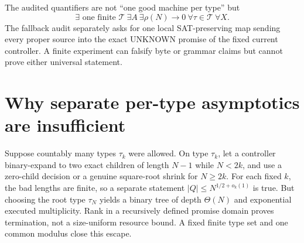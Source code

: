 \documentclass[11pt]{article}
\begin{document}
The audited quantifiers are not ``one good machine per type'' but
\[
 \exists\text{ one finite }\mathcal T\ \exists A\ \exists\rho(N)\to0\
 \forall\tau\in\mathcal T\ \forall X.                   \tag{1}
\]
The fallback audit separately asks for one local SAT-preserving map sending
every proper source into the exact UNKNOWN promise of the fixed current
controller.  A finite experiment can falsify byte or grammar claims but
cannot prove either universal statement.

\section{Why separate per-type asymptotics are insufficient}
Suppose countably many types $\tau_k$ were allowed.  On type $\tau_k$, let a
controller binary-expand to two exact children of length $N-1$ while
$N<2k$, and use a zero-child decision or a genuine square-root shrink for
$N\ge2k$.  For each fixed $k$, the bad lengths are finite, so a separate
statement $|Q|\le N^{1/2+o_k(1)}$ is true.  But choosing the root type
$\tau_N$ yields a binary tree of depth $\Theta(N)$ and exponential executed
multiplicity.  Rank in a recursively defined promise domain proves
termination, not a size-uniform resource bound.  A fixed finite type set and
one common modulus close this escape.
\end{document}
